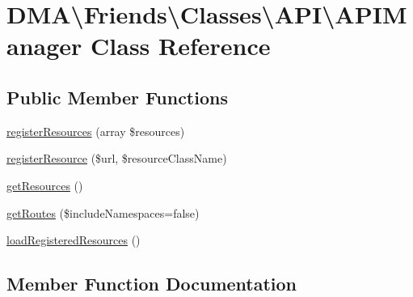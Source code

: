 \hypertarget{classDMA_1_1Friends_1_1Classes_1_1API_1_1APIManager}{}\section{D\+M\+A\textbackslash{}Friends\textbackslash{}Classes\textbackslash{}A\+P\+I\textbackslash{}A\+P\+I\+Manager Class Reference}
\label{classDMA_1_1Friends_1_1Classes_1_1API_1_1APIManager}
\subsection*{Public Member Functions}
\begin{DoxyCompactItemize}
\item 
\hyperlink{classDMA_1_1Friends_1_1Classes_1_1API_1_1APIManager_a7f1a8fb5292558288b627ca0d05939ab}{register\+Resources} (array \$resources)
\item 
\hyperlink{classDMA_1_1Friends_1_1Classes_1_1API_1_1APIManager_a4840b21b124bdd3640f33d52511defdf}{register\+Resource} (\$url, \$resource\+Class\+Name)
\item 
\hyperlink{classDMA_1_1Friends_1_1Classes_1_1API_1_1APIManager_aeafe3f85b5ab18331264fb4ce04085c0}{get\+Resources} ()
\item 
\hyperlink{classDMA_1_1Friends_1_1Classes_1_1API_1_1APIManager_a38dc407ea186640c86b96caf7b908df3}{get\+Routes} (\$include\+Namespaces=false)
\item 
\hyperlink{classDMA_1_1Friends_1_1Classes_1_1API_1_1APIManager_a03303291e15aa07cb42c99f051a319c5}{load\+Registered\+Resources} ()
\end{DoxyCompactItemize}


\subsection{Member Function Documentation}
\hypertarget{classDMA_1_1Friends_1_1Classes_1_1API_1_1APIManager_aeafe3f85b5ab18331264fb4ce04085c0}{}

